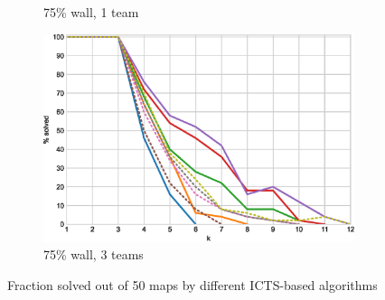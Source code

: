 \documentclass[english,10pt]{article}
\begin{document}
\begin{figure}[t]
\begin{subfigure}{0.44\textwidth}
			\caption{75\% wall, 1 team}
			\label{fig:i-75-1-p}
		\end{subfigure}
		\begin{subfigure}{0.44\textwidth}
			\centering
			\includegraphics[width=\linewidth]{img/results/icts-comparison/75-3-p}
			\caption{75\% wall, 3 teams}
			\label{fig:i-75-3-p}
		\end{subfigure}
		\caption{Fraction solved out of 50 maps by different ICTS-based algorithms}
		\label{fig:i-probs}
	\end{figure}
\end{document}
